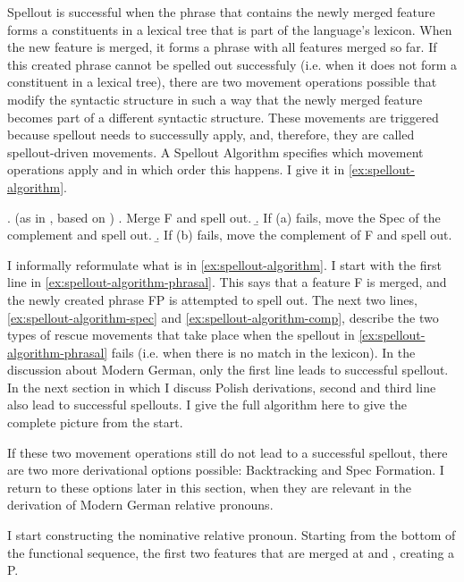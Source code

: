 Spellout is successful when the phrase that contains the newly merged feature forms a constituents in a lexical tree that is part of the language's lexicon.
When the new feature is merged, it forms a phrase with all features merged so far.
If this created phrase cannot be spelled out successfuly (i.e. when it does not form a constituent in a lexical tree), there are two movement operations possible that modify the syntactic structure in such a way that the newly merged feature becomes part of a different syntactic structure.
These movements are triggered because spellout needs to successully apply, and, therefore, they are called spellout-driven movements.
A Spellout Algorithm specifies which movement operations apply and in which order this happens. I give it in \ref{ex:spellout-algorithm}.

\ex.  (as in \citealt{caha2020a}, based on \citealt{starke2018})\label{ex:spellout-algorithm}
 \a. Merge F and spell out.\label{ex:spellout-algorithm-phrasal}
 \b. If (a) fails, move the Spec of the complement and spell out.\label{ex:spellout-algorithm-spec}
 \b. If (b) fails, move the complement of F and spell out.\label{ex:spellout-algorithm-comp}

I informally reformulate what is in \ref{ex:spellout-algorithm}. I start with the first line in \ref{ex:spellout-algorithm-phrasal}. This says that a feature F is merged, and the newly created phrase FP is attempted to spell out.
The next two lines, \ref{ex:spellout-algorithm-spec} and \ref{ex:spellout-algorithm-comp}, describe the two types of rescue movements that take place when the spellout in \ref{ex:spellout-algorithm-phrasal} fails (i.e. when there is no match in the lexicon).
In the discussion about Modern German, only the first line leads to successful spellout. In the next section in which I discuss Polish derivations, second and third line also lead to successful spellouts. I give the full algorithm here to give the complete picture from the start.

If these two movement operations still do not lead to a successful spellout, there are two more derivational options possible: Backtracking and Spec Formation. I return to these options later in this section, when they are relevant in the derivation of Modern German relative pronouns.

I start constructing the nominative relative pronoun. Starting from the bottom of the functional sequence, the first two features that are merged at  and , creating a P.

